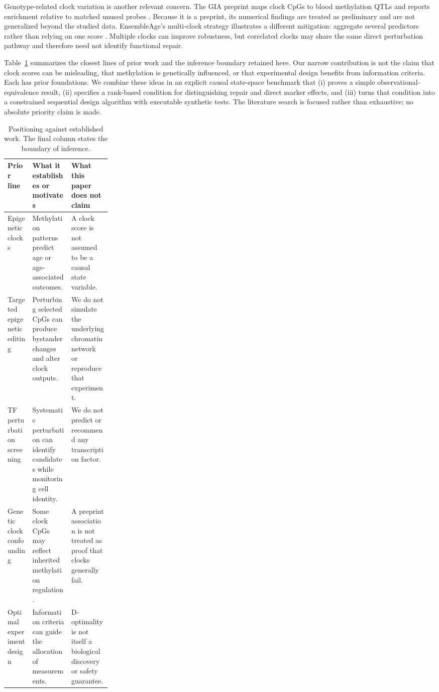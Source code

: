 \documentclass[10pt,a4paper]{article}
\begin{document}
Genotype-related clock variation is another relevant concern. The GIA preprint maps clock CpGs to blood methylation QTLs and reports enrichment relative to matched unused probes \citep{lim2026}. Because it is a preprint, its numerical findings are treated as preliminary and are not generalized beyond the studied data. EnsembleAge's multi-clock strategy illustrates a different mitigation: aggregate several predictors rather than relying on one score \citep{haghani2025}. Multiple clocks can improve robustness, but correlated clocks may share the same direct perturbation pathway and therefore need not identify functional repair.

Table~\ref{tab:position} summarizes the closest lines of prior work and the inference boundary retained here. Our narrow contribution is not the claim that clock scores can be misleading, that methylation is genetically influenced, or that experimental design benefits from information criteria. Each has prior foundations. We combine these ideas in an explicit causal state-space benchmark that (i) proves a simple observational-equivalence result, (ii) specifies a rank-based condition for distinguishing repair and direct marker effects, and (iii) turns that condition into a constrained sequential design algorithm with executable synthetic tests. The literature search is focused rather than exhaustive; no absolute priority claim is made.

\begin{table}[!htbp]
\centering
\caption{Positioning against established work. The final column states the boundary of inference.}
\label{tab:position}
\small
\begin{tabularx}{\linewidth}{p{0.24\linewidth} X X}
\toprule
\textbf{Prior line} & \textbf{What it establishes or motivates} & \textbf{What this paper does not claim} \\
\midrule
Epigenetic clocks \citep{horvath2013,levine2018,lu2019} & Methylation patterns predict age or age-associated outcomes. & A clock score is not assumed to be a causal state variable. \\
Targeted epigenetic editing \citep{liesenfelder2025} & Perturbing selected CpGs can produce bystander changes and alter clock outputs. & We do not simulate the underlying chromatin network or reproduce that experiment. \\
TF perturbation screening \citep{sengstack2026} & Systematic perturbation can identify candidates while monitoring cell identity. & We do not predict or recommend any transcription factor. \\
Genetic clock confounding \citep{lim2026} & Some clock CpGs may reflect inherited methylation regulation. & A preprint association is not treated as proof that clocks generally fail. \\
Optimal experiment design \citep{chaloner1995,mackay1992} & Information criteria can guide the allocation of measurements. & D-optimality is not itself a biological discovery or safety guarantee. \\
\bottomrule
\end{tabularx}
\end{table}
\end{document}
